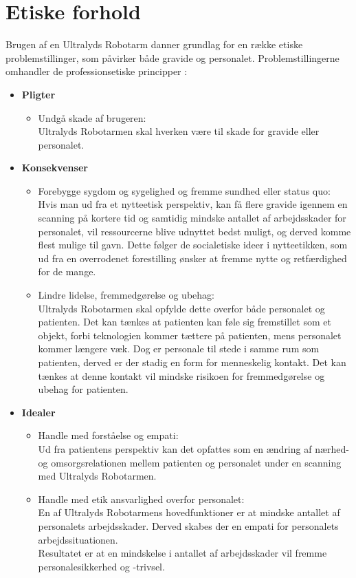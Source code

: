 \section{Etiske forhold}
Brugen af en Ultralyds Robotarm danner grundlag for en række etiske problemstillinger, som påvirker både gravide og personalet. 
Problemstillingerne omhandler de professionsetiske principper \cite{Husted}: 
\begin{itemize}
	\item \textbf{Pligter}
	\begin{itemize}
		\item Undgå skade af brugeren:\\ 
		Ultralyds Robotarmen skal hverken være til skade for gravide eller personalet. 
	\end{itemize} 
	\item \textbf{Konsekvenser}
	\begin{itemize}
		\item Forebygge sygdom og sygelighed og fremme sundhed eller status quo: \\
		Hvis man ud fra et nytteetisk perspektiv, kan få flere gravide igennem en scanning på kortere tid og samtidig mindske antallet af arbejdsskader for personalet, vil ressourcerne blive udnyttet bedst muligt, og derved komme flest mulige til gavn. Dette følger de socialetiske ideer i nytteetikken, som ud fra en overrodenet forestilling ønsker at fremme nytte og retfærdighed for de mange.    
		\item Lindre lidelse, fremmedgørelse og ubehag:\\
		Ultralyds Robotarmen skal opfylde dette overfor både personalet og patienten. Det kan tænkes at patienten kan føle sig fremstillet som et objekt, forbi teknologien kommer tættere på patienten, mens personalet kommer længere væk. Dog er personale til stede i samme rum som patienten, derved er der stadig en form for menneskelig kontakt. Det kan tænkes at denne kontakt vil mindske risikoen for fremmedgørelse og ubehag for patienten.   
	\end{itemize}
	\item \textbf{Idealer}
	\begin{itemize}
		\item Handle med forståelse og empati:\\
		Ud fra patientens perspektiv kan det opfattes som en ændring af nærhed- og omsorgsrelationen mellem patienten og personalet under en scanning med Ultralyds Robotarmen. 
		\item Handle med etik ansvarlighed overfor personalet:\\
		En af Ultralyds Robotarmens hovedfunktioner er at mindske antallet af personalets arbejdsskader. Derved skabes der en empati for personalets arbejdssituationen.\\
		Resultatet er at en mindskelse i antallet af arbejdsskader vil fremme personalesikkerhed og -trivsel.   		
	\end{itemize} 
\end{itemize} 

